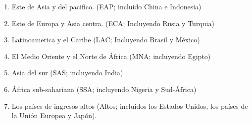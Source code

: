 \begin{multicols}{2}
    \begin{enumerate}[\bfseries (i)]

	\item Este de Asia y del pacifico. (EAP; incluido China e Indonesia)
	\item Este de Europa y Asia centra. (ECA; Incluyendo Rusia y Turquia)
	\item Latinoamerica y el Caribe (LAC; Incluyendo Brasil y México)
	\item El Medio Oriente y el Norte de África (MNA; incluyendo Egipto)
	\item Asia del sur (SAS; incluyendo India)
	\item África sub-sahariana (SSA; incluyendo Nigeria y Sud-África) 
	\item Los países de ingresos altos (Altos; incluidos los Estados Unidos, los países de la Unión Europea y Japón).\\

    \end{enumerate}




\end{multicols}
